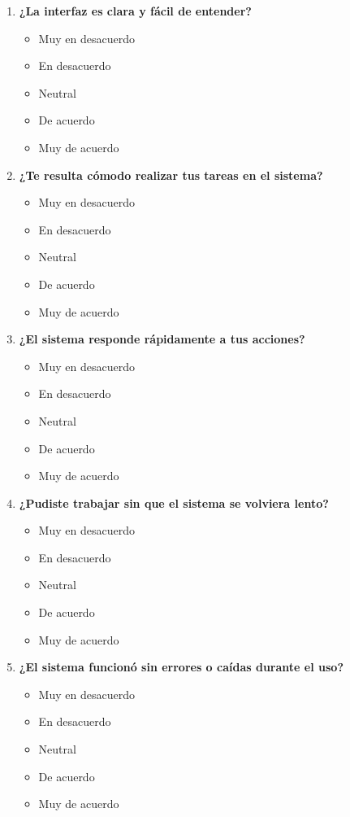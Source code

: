 \documentclass[conference]{IEEEtran}
\begin{document}
\begin{enumerate}
    \item \textbf{¿La interfaz es clara y fácil de entender?}
        \begin{itemize}
            \item Muy en desacuerdo
            \item En desacuerdo
            \item Neutral
            \item De acuerdo
            \item Muy de acuerdo
        \end{itemize}
        
    \item \textbf{¿Te resulta cómodo realizar tus tareas en el sistema?}
        \begin{itemize}
            \item Muy en desacuerdo
            \item En desacuerdo
            \item Neutral
            \item De acuerdo
            \item Muy de acuerdo
        \end{itemize}
        
    \item \textbf{¿El sistema responde rápidamente a tus acciones?}
        \begin{itemize}
            \item Muy en desacuerdo
            \item En desacuerdo
            \item Neutral
            \item De acuerdo
            \item Muy de acuerdo
        \end{itemize}
        
    \item \textbf{¿Pudiste trabajar sin que el sistema se volviera lento?}
        \begin{itemize}
            \item Muy en desacuerdo
            \item En desacuerdo
            \item Neutral
            \item De acuerdo
            \item Muy de acuerdo
        \end{itemize}
        
    \item \textbf{¿El sistema funcionó sin errores o caídas durante el uso?}
        \begin{itemize}
            \item Muy en desacuerdo
            \item En desacuerdo
            \item Neutral
            \item De acuerdo
            \item Muy de acuerdo
        \end{itemize}
        

\end{enumerate}
\end{document}
